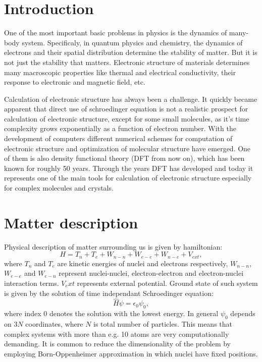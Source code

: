 \documentclass[openany, longbibliography,slovene,a4paper,12pt]{article}
\begin{document}
\section{Introduction}
One of the most important basic problems in physics is the dynamics of many-body system. Specificaly, in quantum physics and chemistry, the dynamics of electrons and their spatial distribution determine the stability of matter. But it is not just the stability that matters. Electronic structure of materials determines many macroscopic properties like thermal and electrical conductivity, their response to electronic and magnetic field, etc.

Calculation of electronic structure has always been a challenge. It quickly became apparent that direct use of schroedinger equation is not a realistic prospect for calculation of electronic structure, except for some small molecules, as it's time complexity grows exponentially as a function of electron number. With the development of computers different numerical schemes for computation of electronic structure and optimization of molecular structure have emerged. One of them is also density functional theory (DFT from now on), which has been known for roughly 50 years. Through the years DFT has developed and today it represents one of the main tools for calculation of electronic structure especially for complex molecules and crystals.

\section{Matter description}
Physical description of matter surrounding us is given by hamiltonian:
\begin{equation}
H=T_n + T_e + W_{n-n} + W_{e-e} + W_{n-e} + V_{ext},
\end{equation}
where $T_n$ and $T_e$ are kinetic energies of nuclei and electrons respectively, $W_{n-n}$, $W_{e-e}$ and $W_{e-n}$ represent  nuclei-nuclei, electron-electron and electron-nuclei interaction terms. $V_ext$ represents external potential. Ground state of such system is given by the solution of time independant Schroedinger equation:
\begin{equation}
\hat H \psi = \epsilon_0 \psi_0,
\end{equation} 
where index $0$ denotes the solution with the lowest energy. In general $\psi_0$ depends on $3N$ coordinates, where $N$ is total number of particles. This means that complex systems with more than e.g. 10 atoms are very computationally demanding. It is common to reduce the dimensionality of the problem by employing Born-Oppenheimer approximation in which nuclei have fixed positions.
\end{document}
